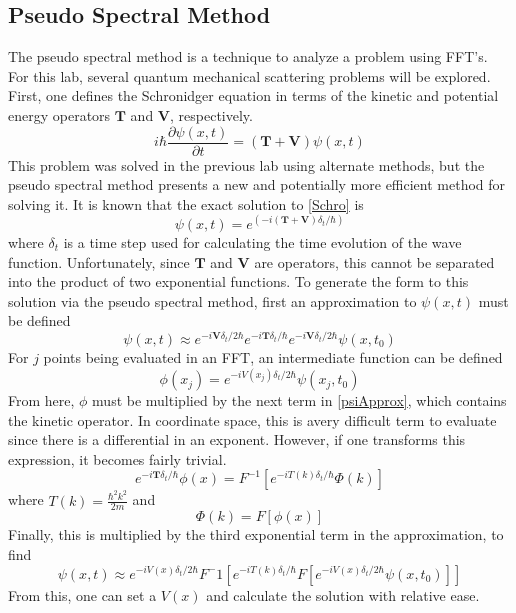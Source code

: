 \documentclass[12pt]{article}
\begin{document}
\subsection{Pseudo Spectral Method}
The pseudo spectral method is a technique to analyze a problem using FFT's.  For this lab, several quantum mechanical scattering problems will be explored.  First, one defines the Schronidger equation in terms of the kinetic and potential energy operators $\mathbf{T}$ and $\mathbf{V}$, respectively.
\begin{equation}
\label{Schro}
i \hbar \frac{\partial \psi(x,t)}{\partial t} = (\mathbf{T} + \mathbf{V})\psi(x,t)
\end{equation}
This problem was solved in the previous lab using alternate methods, but the pseudo spectral method presents a new and potentially more efficient method for solving it.  It is known that the exact solution to \eqref{Schro} is 
\begin{equation}
\label{SchroSoln}
\psi(x,t)=e^(-i(\mathbf{T}+\mathbf{V})\delta_t/\hbar)
\end{equation}
where $\delta_t$ is a time step used for calculating the time evolution of the wave function.  Unfortunately, since $\mathbf{T}$ and $\mathbf{V}$ are operators, this cannot be separated into the product of two exponential functions.  To generate the form to this solution via the pseudo spectral method, first an approximation to $\psi(x,t)$ must be defined
\begin{equation}
\label{psiApprox}
\psi(x,t)\approx e^{-i\mathbf{V}\delta_t/2\hbar}e^{-i\mathbf{T}\delta_t/\hbar}e^{-i\mathbf{V}\delta_t/2\hbar} \psi(x,t_0)
\end{equation}
For $j$ points being evaluated in an FFT, an intermediate function can be defined
\begin{equation}
\label{phi}
\phi(x_j)=e^{-i V(x_j)\delta_t/2\hbar} \psi(x_j,t_0)
\end{equation}
From here, $\phi$ must be multiplied by the next term in \eqref{psiApprox}, which contains the kinetic operator.  In coordinate space, this is avery difficult term to evaluate since there is a differential in an exponent.  However, if one transforms this expression, it becomes fairly trivial.  
\begin{equation}
\label{kineticPhi}
e^{-i\mathbf{T}\delta_t/\hbar} \phi(x) = F^{-1}[e^{-i T(k) \delta_t /\hbar} \Phi(k)]
\end{equation}
where $T(k)=\frac{\hbar^2 k^2}{2m}$ and 
\begin{equation}
\label{PHI}
\Phi(k) = F[\phi(x)]
\end{equation}
Finally, this is multiplied by the third exponential term in the approximation, to find
\begin{equation}
\label{fullPsi}
\psi(x,t) \approx e^{-i V(x) \delta_t/2\hbar} F^-1[e^{-i T(k)\delta_t/\hbar} F[e^{-i V(x) \delta_t /2\hbar} \psi(x,t_0)]]
\end{equation}
From this, one can set a $V(x)$ and calculate the solution with relative ease.
\end{document}
